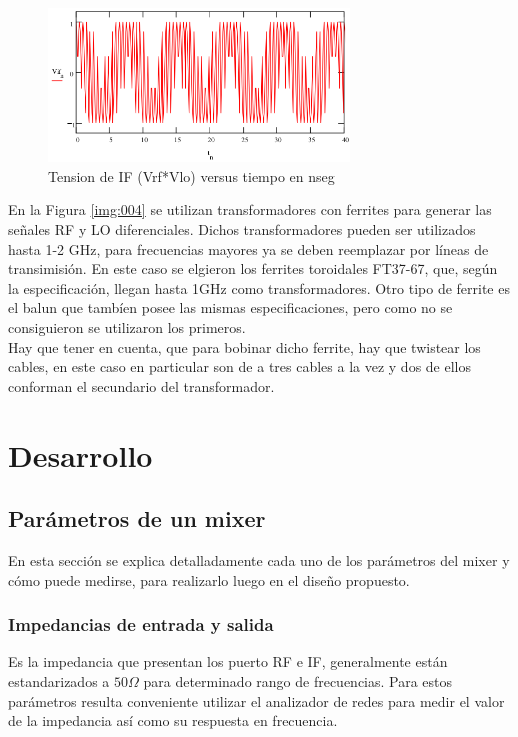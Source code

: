 \documentclass[a4paper,10pt]{article}
\begin{document}
	\begin{figure}[!htb]
		\centering
		\includegraphics[width=8cm]{Images/VIF.png}
		\caption{Tension de IF (Vrf*Vlo) versus tiempo en nseg}
		\label{img:007}
	\end{figure}

	\indent En la Figura \ref{img:004} se utilizan transformadores con ferrites 
	para generar las señales RF y LO diferenciales. Dichos transformadores 
	pueden ser utilizados hasta 1-2 GHz, para frecuencias mayores ya se deben 
	reemplazar por líneas de transimisión. En este caso se elgieron los 
	ferrites toroidales FT37-67, que, según la especificación, llegan hasta 1GHz
	como transformadores. Otro tipo de ferrite es el balun que tambíen posee las
	mismas especificaciones, pero como no se consiguieron se utilizaron los 
	primeros.\\
	\indent Hay que tener en cuenta, que para bobinar dicho ferrite, hay que 
	twistear los cables, en este caso en particular son de a tres cables a la 
	vez y dos de ellos conforman el secundario del transformador.

\newpage
\section{Desarrollo}
	\subsection{Parámetros de un mixer}
	En esta secci\'on se explica detalladamente cada uno de los par\'ametros del mixer y c\'omo puede medirse, para realizarlo luego en el dise\~no propuesto.
		\subsubsection{Impedancias de entrada y salida}
		Es la impedancia que presentan los puerto RF e IF, generalmente est\'an estandarizados a $50\Omega$ para determinado rango de frecuencias. Para estos par\'ametros resulta conveniente utilizar el analizador de redes para medir el valor de la impedancia as\'i como su respuesta en frecuencia.
\end{document}
